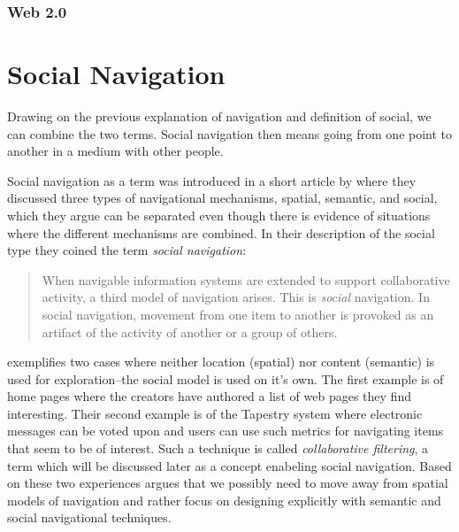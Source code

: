 \subsubsection{Web 2.0}

\section{Social Navigation}
\label{section:background.social.navigation}
Drawing on the previous explanation of navigation and definition of social, we
can combine the two terms. Social navigation then means going from one point
to another in a medium with other people.

Social navigation as a term was introduced in a short article by
\citet{dourish94} where they discussed three types of navigational mechanisms,
spatial, semantic, and social, which they argue can be separated even though
there is evidence of situations where the different mechanisms are combined.
In their description of the social type they coined the term
\emph{social navigation}:

\begin{quote}
  When navigable information systems are extended to support collaborative
  activity, a third model of navigation arises. This is \emph{social}
  navigation. In social navigation, movement from one item to another is
  provoked as an artifact of the activity of another or a group of others.
  \citep[p.~1]{dourish94}
\end{quote}

\citeauthor{dourish94} exemplifies two cases where neither location
(spatial) nor content (semantic) is used for exploration--the social model
is used on it's own. The first example is of home pages where the creators
have authored a list of web pages they find interesting. Their second example
is of the Tapestry \citep{goldberg92} system where electronic messages can be
voted upon and users can use such metrics for navigating items that seem to be
of interest. Such a technique is called \emph{collaborative filtering},
a term which will be discussed later as a concept enabeling social
navigation. Based on these two experiences \citeauthor{dourish94} argues that
we possibly need to move away from spatial models of navigation and rather
focus on designing explicitly with semantic and social navigational
techniques.

